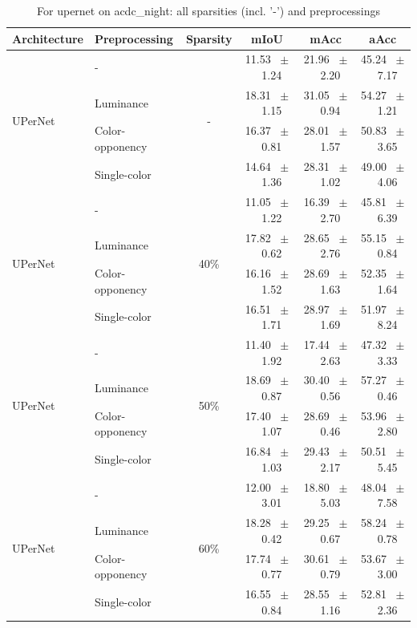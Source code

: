 \begin{table}[h]
  \centering
  \caption{For upernet on acdc_night: all sparsities (incl. '-') and preprocessings}
  \begin{tabular}{@{}l l c c c c@{}}
    \toprule
    Architecture & Preprocessing & Sparsity & mIoU & mAcc & aAcc \\
    \midrule
    \multirow{4}{*}{UPerNet} & - & \multirow{4}{*}{-} & 11.53 ~$\pm$~ 1.24 & 21.96 ~$\pm$~ 2.20 & 45.24 ~$\pm$~ 7.17 \\
    & Luminance &  & 18.31 ~$\pm$~ 1.15 & 31.05 ~$\pm$~ 0.94 & 54.27 ~$\pm$~ 1.21 \\
    & Color-opponency &  & 16.37 ~$\pm$~ 0.81 & 28.01 ~$\pm$~ 1.57 & 50.83 ~$\pm$~ 3.65 \\
    & Single-color &  & 14.64 ~$\pm$~ 1.36 & 28.31 ~$\pm$~ 1.02 & 49.00 ~$\pm$~ 4.06 \\
    \midrule
    \multirow{4}{*}{UPerNet} & - & \multirow{4}{*}{40\%} & 11.05 ~$\pm$~ 1.22 & 16.39 ~$\pm$~ 2.70 & 45.81 ~$\pm$~ 6.39 \\
    & Luminance &  & 17.82 ~$\pm$~ 0.62 & 28.65 ~$\pm$~ 2.76 & 55.15 ~$\pm$~ 0.84 \\
    & Color-opponency &  & 16.16 ~$\pm$~ 1.52 & 28.69 ~$\pm$~ 1.63 & 52.35 ~$\pm$~ 1.64 \\
    & Single-color &  & 16.51 ~$\pm$~ 1.71 & 28.97 ~$\pm$~ 1.69 & 51.97 ~$\pm$~ 8.24 \\
    \midrule
    \multirow{4}{*}{UPerNet} & - & \multirow{4}{*}{50\%} & 11.40 ~$\pm$~ 1.92 & 17.44 ~$\pm$~ 2.63 & 47.32 ~$\pm$~ 3.33 \\
    & Luminance &  & 18.69 ~$\pm$~ 0.87 & 30.40 ~$\pm$~ 0.56 & 57.27 ~$\pm$~ 0.46 \\
    & Color-opponency &  & 17.40 ~$\pm$~ 1.07 & 28.69 ~$\pm$~ 0.46 & 53.96 ~$\pm$~ 2.80 \\
    & Single-color &  & 16.84 ~$\pm$~ 1.03 & 29.43 ~$\pm$~ 2.17 & 50.51 ~$\pm$~ 5.45 \\
    \midrule
    \multirow{4}{*}{UPerNet} & - & \multirow{4}{*}{60\%} & 12.00 ~$\pm$~ 3.01 & 18.80 ~$\pm$~ 5.03 & 48.04 ~$\pm$~ 7.58 \\
    & Luminance &  & 18.28 ~$\pm$~ 0.42 & 29.25 ~$\pm$~ 0.67 & 58.24 ~$\pm$~ 0.78 \\
    & Color-opponency &  & 17.74 ~$\pm$~ 0.77 & 30.61 ~$\pm$~ 0.79 & 53.67 ~$\pm$~ 3.00 \\
    & Single-color &  & 16.55 ~$\pm$~ 0.84 & 28.55 ~$\pm$~ 1.16 & 52.81 ~$\pm$~ 2.36 \\
    \midrule

\end{tabular}
\end{table}
